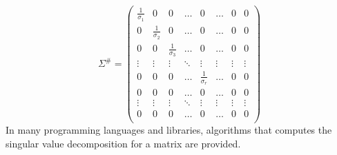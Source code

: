 \documentclass[10pt, letterpaper]{report}
\begin{document}
\begin{equation}
    \Sigma^\#=\begin{pmatrix}
        \frac{1}{\sigma_1}&0&0&\dots &0 &\dots &0& 0\\
        0&\frac{1}{\sigma_2}&0&\dots &0 &\dots &0& 0\\
        0&0&\frac{1}{\sigma_3}&\dots &0 &\dots &0& 0\\ 
        \vdots&\vdots&\vdots&\ddots &\vdots &\vdots &\vdots& \vdots\\ 
         0&0&0&\dots &\frac{1}{\sigma_r} &\dots &0& 0\\ 
         0&0&0&\dots &0 &\dots &0& 0\\ 
         \vdots&\vdots&\vdots&\ddots &\vdots &\vdots &\vdots& \vdots\\ 
         0&0&0&\dots &0 &\dots &0& 0\\ 
    \end{pmatrix}
\end{equation}
In many programming languages and libraries, algorithms that computes the singular value decomposition for a matrix are provided. \bigskip 
\end{document}
